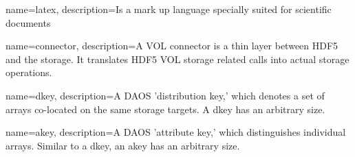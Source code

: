 \makeglossaries

{
        name=latex,
        description={Is a mark up language specially suited for 
scientific documents}
}
  
{
        name=connector,
        description={A VOL connector is a thin layer between HDF5 and the storage.
It translates HDF5 VOL storage related calls into actual storage operations.}
}

{
        name=dkey,
        description={A DAOS 'distribution key,' which denotes a set of arrays co-located on the same storage targets. A dkey has an arbitrary size.}
}

{
        name=akey,
        description={A DAOS 'attribute key,' which distinguishes individual arrays. Similar to a dkey, an akey has an arbitrary size.}
}




